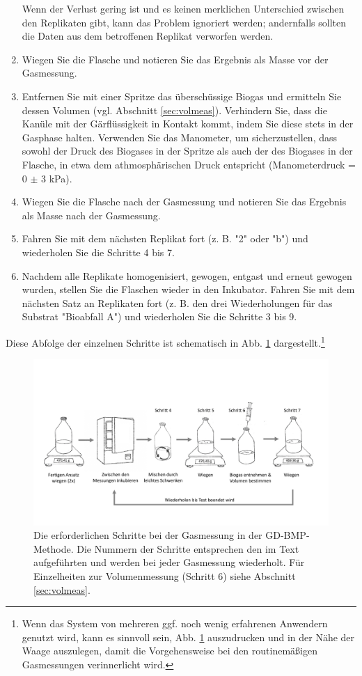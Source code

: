 \documentclass[]{article}
\begin{document}
\begin{enumerate}
{        Wenn der Verlust gering ist und es keinen merklichen Unterschied zwischen den Replikaten gibt, kann das Problem ignoriert werden; andernfalls sollten die Daten aus dem betroffenen Replikat verworfen werden.
      }
    \item Wiegen Sie die Flasche und notieren Sie das Ergebnis als Masse vor der Gasmessung.
    \item Entfernen Sie mit einer Spritze das überschüssige Biogas und ermitteln Sie dessen Volumen (vgl. Abschnitt \ref{sec:volmeas}). Verhindern Sie, dass die Kanüle mit der Gärflüssigkeit in Kontakt kommt, indem Sie diese stets in der Gasphase halten.
      Verwenden Sie das Manometer, um sicherzustellen, dass sowohl der Druck des Biogases in der Spritze als auch der des Biogases in der Flasche, in etwa dem athmosphärischen Druck entspricht (Manometerdruck = 0 $\pm$ 3 kPa).
    \item Wiegen Sie die Flasche nach der Gasmessung und notieren Sie das Ergebnis als Masse nach der Gasmessung.
    \item Fahren Sie mit dem nächsten Replikat fort (z. B. "2" oder "b") und wiederholen Sie die Schritte 4 bis 7.
    \item Nachdem alle Replikate homogenisiert, gewogen, entgast und erneut gewogen wurden, stellen Sie die Flaschen wieder in den Inkubator.
    Fahren Sie mit dem nächsten Satz an Replikaten fort (z. B. den drei Wiederholungen für das Substrat "Bioabfall A") und wiederholen Sie die Schritte 3 bis 9.
\end{enumerate}

Diese Abfolge der einzelnen Schritte ist schematisch in Abb. \ref{fig:steps} dargestellt.\footnote{
    Wenn das System von mehreren ggf. noch wenig erfahrenen Anwendern genutzt wird, kann es sinnvoll sein, Abb. \ref{fig:steps} auszudrucken und in der Nähe der Waage auszulegen, damit die Vorgehensweise bei den routinemäßigen Gasmessungen verinnerlicht wird.}

\begin{figure}[ht]
  \includegraphics[width=\textwidth]{figs/GD_steps_DE.pdf}
  \caption{Die erforderlichen Schritte bei der Gasmessung in der GD-BMP-Methode. Die Nummern der Schritte entsprechen den im Text aufgeführten und werden bei jeder Gasmessung wiederholt. Für Einzelheiten zur Volumenmessung (Schritt 6) siehe Abschnitt \ref{sec:volmeas}.}
  \label{fig:steps}
\end{figure}
\end{document}
